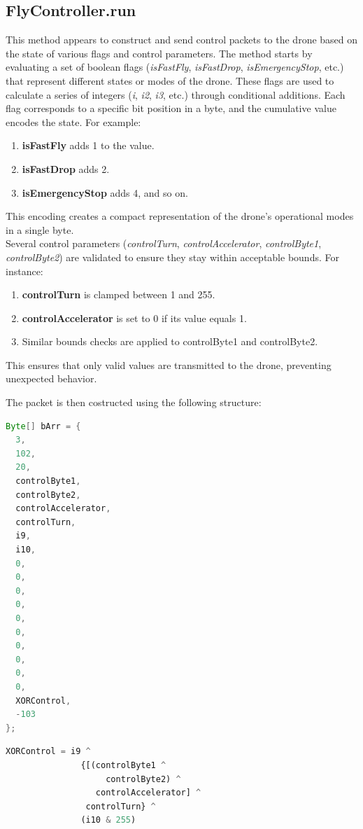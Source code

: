 \subsection*{FlyController.run}
This method appears to construct and send control packets to the drone based on the state of various flags and control parameters.
The method starts by evaluating a set of boolean flags (\textit{isFastFly}, \textit{isFastDrop}, \textit{isEmergencyStop}, etc.) that represent different states or modes of the drone. These flags are used to calculate a series of integers (\textit{i}, \textit{i2}, \textit{i3}, etc.) through conditional additions. Each flag corresponds to a specific bit position in a byte, and the cumulative value encodes the state.
For example:
\begin{enumerate}
    \item \textbf{isFastFly} adds 1 to the value.
    \item \textbf{isFastDrop} adds 2.
    \item \textbf{isEmergencyStop} adds 4, and so on.
\end{enumerate}
This encoding creates a compact representation of the drone's operational modes in a single byte.\\
Several control parameters (\textit{controlTurn}, \textit{controlAccelerator}, \textit{controlByte1}, \textit{controlByte2}) are validated to ensure they stay within acceptable bounds. For instance:
\begin{enumerate}
    \item \textbf{controlTurn} is clamped between 1 and 255.
    \item \textbf{controlAccelerator} is set to 0 if its value equals 1.
    \item \textbf{}Similar bounds checks are applied to controlByte1 and controlByte2.
\end{enumerate}
This ensures that only valid values are transmitted to the drone, preventing unexpected behavior.

The packet is then costructed using the following structure:
\begin{lstlisting}[language=Java, caption=Packet structure]
  Byte[] bArr = {
  3,
  102,
  20,
  controlByte1,
  controlByte2,
  controlAccelerator,
  controlTurn,
  i9,
  i10,
  0,
  0,
  0,
  0,
  0,
  0,
  0,
  0,
  0,
  0,
  XORControl,
  -103
};
\end{lstlisting}

\begin{lstlisting}[language=Python, caption=XORControl]
  XORControl = i9 ^ 
               {[(controlByte1 ^ 
                    controlByte2) ^ 
                  controlAccelerator] ^ 
                controlTurn} ^ 
               (i10 & 255)
\end{lstlisting}

